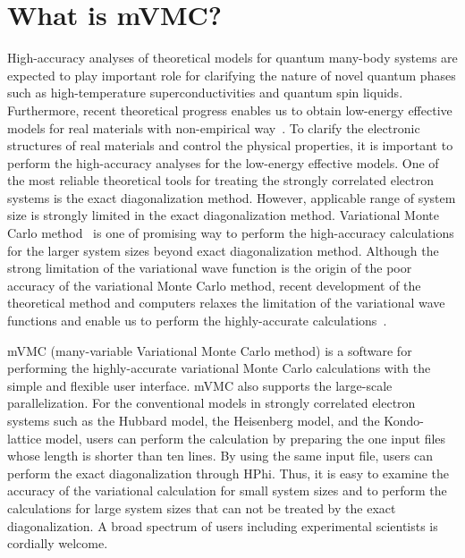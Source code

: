 \chapter{What is mVMC?}
High-accuracy analyses of theoretical models
for quantum many-body systems are expected to
play important role for clarifying the nature of
novel quantum phases such as
high-temperature superconductivities and quantum spin liquids.
Furthermore, recent theoretical progress enables us
to obtain low-energy effective models for real materials 
with non-empirical way~\cite{ImadaMiyake}.
To clarify the electronic structures of real materials and
control the physical properties,
it is important to perform the
high-accuracy analyses for the low-energy effective models.
One of the most reliable theoretical tools for treating
the strongly correlated electron systems is the 
exact diagonalization method.
However, applicable range of system size is strongly limited 
in the exact diagonalization method.
Variational Monte Carlo method~\cite{Gros} is one of promising way
to perform the high-accuracy calculations for the larger
system sizes beyond exact diagonalization method.
Although the strong limitation of the variational wave function
is the origin of the poor accuracy of the variational Monte
Carlo method, recent development of the theoretical method and computers
relaxes the limitation of the variational wave functions and
enable us to perform the highly-accurate calculations~\cite{Tahara2008,Misawa2014,Morita2015}.

mVMC (many-variable Variational Monte Carlo method)
is a software for performing the highly-accurate 
variational Monte Carlo calculations
with the simple and flexible user interface.
mVMC also supports the large-scale parallelization.
For the conventional models in strongly correlated electron systems such as the Hubbard model, the Heisenberg model, and the Kondo-lattice model,
users can perform the calculation by preparing the one input files whose length is shorter than ten lines.  
By using the same input file, users can perform the exact diagonalization through HPhi.
Thus, it is easy to examine the accuracy of the variational calculation for small system sizes
and to perform the calculations 
for large system sizes that can not be treated 
by the exact diagonalization.
A broad spectrum of users including experimental scientists is cordially welcome.

\label{Ch:whatismVMC}

